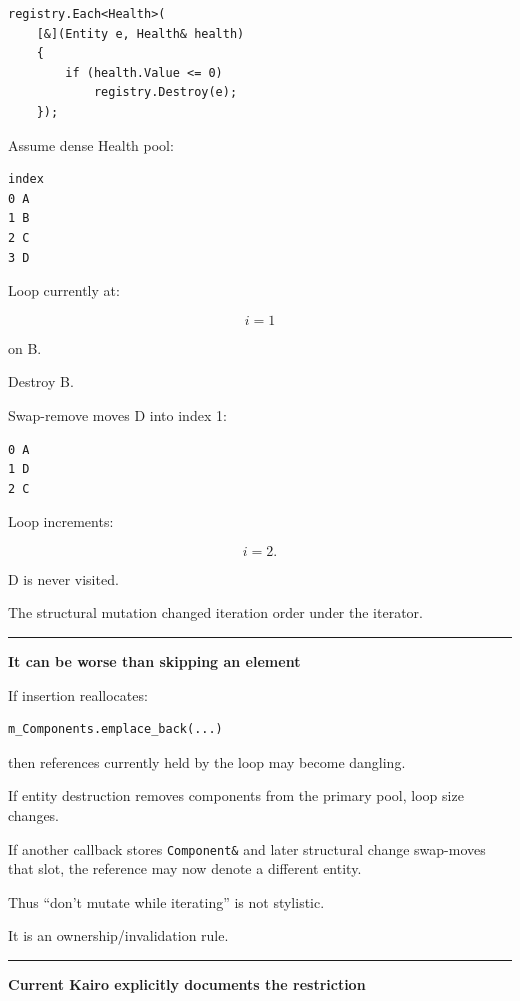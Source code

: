 \begin{verbatim}
registry.Each<Health>(
    [&](Entity e, Health& health)
    {
        if (health.Value <= 0)
            registry.Destroy(e);
    });
\end{verbatim}

Assume dense Health pool:

\begin{verbatim}
index
0 A
1 B
2 C
3 D
\end{verbatim}

Loop currently at:

\[
i=1
\]

on B.

Destroy B.

Swap-remove moves D into index 1:

\begin{verbatim}
0 A
1 D
2 C
\end{verbatim}

Loop increments:

\[
i=2.
\]

D is never visited.

The structural mutation changed iteration order under the iterator.

\begin{center}\rule{0.5\linewidth}{0.5pt}\end{center}

\textbf{It can be worse than skipping an element}

If insertion reallocates:

\begin{verbatim}
m_Components.emplace_back(...)
\end{verbatim}

then references currently held by the loop may become dangling.

If entity destruction removes components from the primary pool, loop size changes.

If another callback stores \texttt{Component\&} and later structural change swap-moves that slot, the reference may now denote a different entity.

Thus ``don't mutate while iterating'' is not stylistic.

It is an ownership/invalidation rule.

\begin{center}\rule{0.5\linewidth}{0.5pt}\end{center}

\textbf{Current Kairo explicitly documents the restriction}

